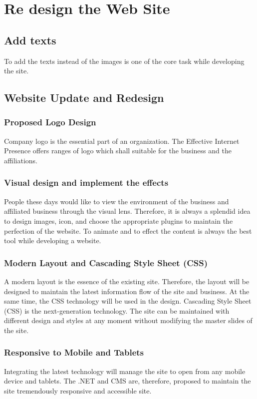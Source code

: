 \documentclass[35pt]{report}
\begin{document}
		\section{Re design the Web Site}
			\subsection{Add texts} 
			To add the texts instead of the images is one of the core task while developing the site. 

			\subsection{Website Update and Redesign}

				\subsubsection{Proposed Logo Design}
				Company logo is the essential part of an organization. The Effective Internet Presence offers ranges of logo which shall suitable for the business and the affiliations. 
			
				\subsubsection{Visual design and implement the effects}
			People these days would like to view the environment of the business and affiliated business through the visual lens. Therefore, it is always a splendid idea to design images, icon, and choose the appropriate plugins to maintain the perfection of the website. To animate and to effect the content is always the best tool while developing a website.

				\subsubsection{Modern Layout and Cascading Style Sheet (CSS)}
A modern layout is the essence of the existing site. Therefore, the layout will be designed to maintain the latest information flow of the site and business. At the same time, the CSS technology will be used in the design. Cascading Style Sheet (CSS) is the next-generation technology. The site can be maintained with different design and styles at any moment without modifying the master slides of the site.  

				\subsubsection{Responsive to Mobile and Tablets}
Integrating the latest technology will manage the site to open from any mobile device and tablets. The .NET and CMS are, therefore, proposed to maintain the site tremendously responsive and accessible site. 
			
\end{document}

